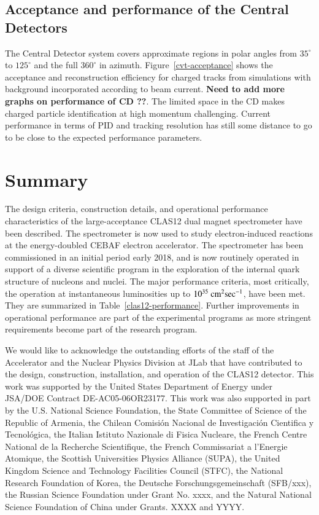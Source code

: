 \documentclass[final,3p,twocolumn]{elsarticle}
\begin{document}
\subsection{\rm Acceptance and performance of the Central Detectors} 

The Central Detector system covers approximate regions in polar angles from $35^\circ$ to $125^\circ$ and 
the full $360^\circ$ in azimuth.  Figure~\ref{cvt-acceptance} shows the acceptance 
and reconstruction efficiency for charged tracks from simulations with background incorporated according to beam current. 
  {\bf Need to add more graphs on performance of CD ??}. The limited space in the CD makes charged particle identification 
  at high momentum challenging. Current performance in terms of PID and tracking resolution has still some distance to go to 
  be close to the expected performance parameters.   


\section{Summary} 
The design criteria, construction details, and operational performance characteristics of the large-acceptance CLAS12 dual 
magnet spectrometer have been described. The spectrometer is now used to study 
electron-induced reactions at the energy-doubled CEBAF electron accelerator. The spectrometer has been commissioned 
in an initial period early 2018, and is now routinely 
operated in support of a diverse scientific program in the exploration of the internal quark structure of nucleons and nuclei. 
The major performance criteria, most critically, the operation at  instantaneous luminosities up to 
$10^{35}\rm~{cm^2}\rm{sec^{-1}}$, have been met. They are summarized in Table~\ref{clas12-performance}. Further improvements 
in operational performance are part of the experimental programs as more stringent requirements become part of the 
research program.  

\vspace{0,5cm}


\vspace{0.3cm}

We would like to acknowledge the outstanding efforts of the staff of the Accelerator and the Nuclear Physics Division at JLab that have 
contributed to the design, construction, installation, and operation of the CLAS12 detector.  This work was supported by the United States Department of Energy under JSA/DOE Contract DE-AC05-06OR23177. This work was also supported in part by the U.S. National Science Foundation, the State Committee of Science of the Republic of Armenia, the Chilean Comisi\'on Nacional de Investigaci\'on Cientifica y Tecnol\'ogica, the Italian Istituto Nazionale di Fisica Nucleare, the French Centre National de la Recherche Scientifique, the French Commissariat a l'Energie Atomique, the Scottish Universities Physics Alliance (SUPA), the United Kingdom Science and Technology Facilities Council (STFC), the National Research Foundation of Korea, the Deutsche Forschungsgemeinschaft (SFB/xxx), the Russian Science Foundation under Grant No. xxxx, and the Natural National Science Foundation of China under Grants. XXXX and YYYY. 
\end{document}
